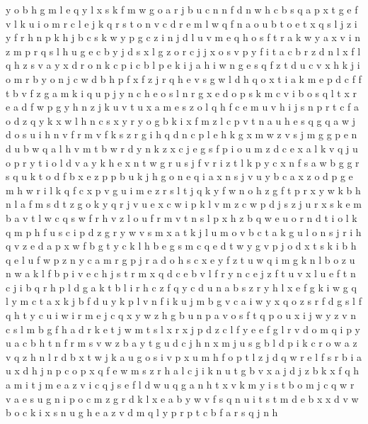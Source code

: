 \documentclass{article}
\begin{document}
y
o b h g m
l e q
y l x s k f m w g o a r j b u c n
n f
d n w h c b s q a p x t g e f v l k u i o m r
c l e j k q r s t o n v
c d r e m l w q f n a o u b t
o e t x q s l j z i y f r h n p k
h j b c s k w y
p g c z i n j d l u v m e q h o s f t r a k w y
a x v i n z m p r q s l h u g e c b y j d
s x l g z o r c j
j x o s v p y f i t a c b r z d n l
x
f l q h z s v a y x d r o n k c p i
c b l p e k i j
a h i w
n g e s q f z t d u c v x h k j i o m r b
y o n j c w d b h p f
x f z j r q h e v s g w l d
h q o x t i a k m e p d c f
f
t b v f z g a m k i q u p j y n c h e o s l
n r g x e d o p s k
m c v i b o s q l t x r e a d f w p g y h n z j k u
v t u x a m e s z o l q h f c
e m u v h i j s n p r t c f a o d z q y k x w l
h n c s x y
r y o g b k i x f m z l c p v t n a u h e s q
g q a w j d o s u i h n v f r m
v f k s z r g i h q
d n c p l e h k g x m w z v s j
m g
g p e n d u b w
q a l h v m t b w r d y n k z x c j e g s f p i o u
m z d c e x a l k v q j u o p r y t
i o l d v a y k h e x n t w g r u s j f
v r i z t l k p y c x n f s a w b g
g r s q u k t o d f b x e z p
p b u k j h g o n e q i a x
n s j v u y b c a x z o d p g e m h w r i l k q f
c x p v g u i m e z r s l t j q k y f w n o h
z g f t p r x
y
w k
b h n l a f m s d t z g o k y q r j v u e x c w i p
k l v m z c w p d j s
z j u r x s k e m b a v t l w c
q s w f r h v z l o u
f r m v t n s l p x h z b q w e u o
r n d t i o l k q m p h f u s
c i p d z g r y w v s m x a t k j l u
m o v b c t a k g
u l o n s j r i h q v z e d a p x w f b g t y c k
l h b e g
s m c q e d t w y g v p
j o d x t s k i b h q e l u f w p z n y c a m r g
p j r a d o h s c x e y f z t u w q i m g k n l b
o z u n w a k l f b p i v e c h j s t r m x q
d c e b v l f r
y
n c e j z f t u v x l
u e f t n c j i b q r h p l d
g a k t b l i r h c z f q y
c d u n a b s z r y h l x e f g k i w
g q l y m c t a x k j b
f d u y k p l v n
f i
k u j m b g v c a i w y x q o z s r f
d g s l f q h t y c u i w
i r m e j c q x y w z h g b u n p a v o s f t
q p o u x i j w y z v n c s l m b g f h a d r k e t
j
w m t s l x
r x j p d z c l f y e
e f g l r v d o m q i p y u a c b h t n
f r m s v w z b a y t g u d c j h n x
m j u s g b l d p i k c r o w a z v q
z h n l r d b x t w j k a u g o s i v p
x u m h f o p t l z j d q
w r e
l f s r b i a u x d h j n p c
o p x q f e w m s z r h a l c j i k n u t g b v
x a j d
j z b k x f q h a m i
t j m
e a z v i c q j s
e f l d w u q g a n h t x v k m y i s
t b o m j c q w r v a e s u g n i p
o c m z g r d k l x e a b y w v f s q n u i t
s t m d e b x
x d v
w b o c k i x s n u g h e a z v d m q l y p r
p t c b f a r s q j n h
\end{document}
